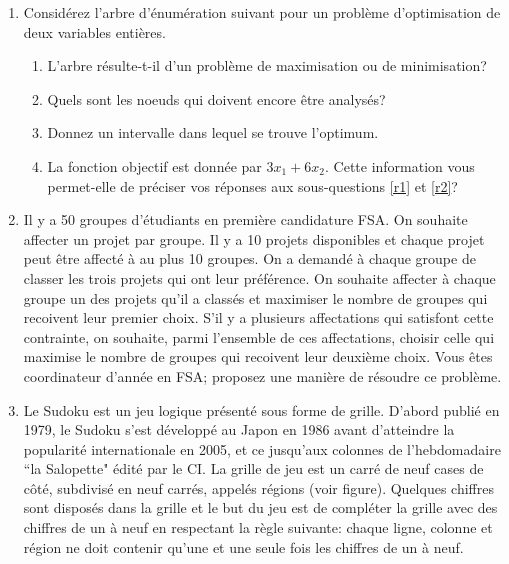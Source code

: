 \begin{enumerate}
  \item Considérez l'arbre d'énumération suivant pour un problème d'optimisation de deux variables entières.

    \begin{enumerate}
      \item L'arbre résulte-t-il d'un problème de maximisation ou de minimisation?
      \item \label{r1} Quels sont les
        noeuds qui doivent encore être analysés?
      \item \label{r2} Donnez un intervalle dans lequel se trouve
        l'optimum.
      \item La fonction objectif est donnée
        par $3x_1+6x_2$. Cette information vous permet-elle de préciser vos réponses aux sous-questions \ref{r1} et
        \ref{r2}?
    \end{enumerate}


    \begin{solution}
    \end{solution}

  \item  Il y a 50 groupes d'étudiants en première candidature FSA. On souhaite affecter un projet par groupe. Il y a 10
    projets disponibles et chaque projet peut être affecté à au plus 10 groupes. On a demandé à chaque groupe de classer les trois projets qui ont leur
    préférence. On souhaite affecter à chaque groupe un des projets qu'il a classés et maximiser le nombre de groupes qui recoivent leur premier choix.
    S'il y a plusieurs affectations qui satisfont cette contrainte, on souhaite, parmi l'ensemble de ces affectations, choisir celle qui maximise le nombre de groupes
    qui recoivent leur deuxième choix. Vous êtes coordinateur d'année en FSA; proposez une manière de résoudre ce problème.


    \begin{solution}
    \end{solution}

  \item Le Sudoku est un jeu logique présenté sous forme de grille. D'abord publié en 1979, le Sudoku s'est développé au Japon en 1986 avant d'atteindre la popularité internationale en 2005, et ce jusqu'aux colonnes de l'hebdomadaire ``la Salopette" édité par le CI. La grille de jeu est un carré de neuf cases de côté, subdivisé en neuf carrés, appelés régions (voir figure). Quelques chiffres sont disposés dans la grille et le but du jeu est de compléter la grille avec des chiffres  de un à neuf en respectant la règle suivante: chaque ligne, colonne et région ne doit contenir qu'une et une seule fois  les chiffres de un à neuf.


\end{enumerate}
